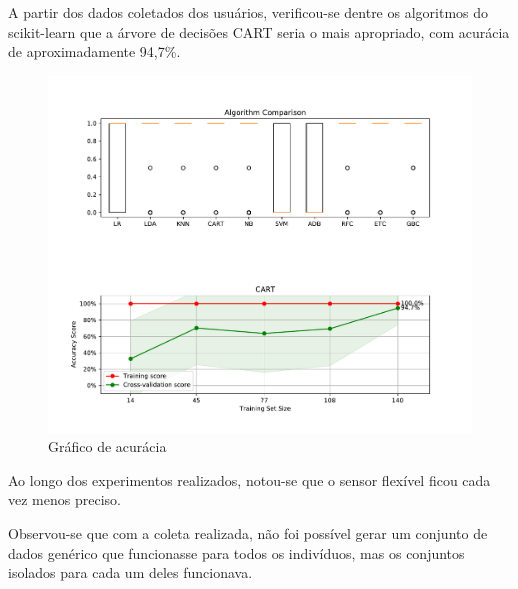 A partir dos dados coletados dos usuários, verificou-se dentre os algoritmos do scikit-learn que a árvore de decisões CART seria o mais apropriado, com acurácia de aproximadamente 94,7\%.
\begin{figure}[ht]
	\caption{\label{fig:result_accuracy_plot}Gráfico de acurácia}
	\begin{center}
	    \includegraphics[width=\textwidth]{resources/result_accuracy_plot}
	\end{center}
\end{figure}

Ao longo dos experimentos realizados, notou-se que o sensor flexível ficou cada vez menos preciso.

Observou-se que com a coleta realizada, não foi possível gerar um conjunto de dados genérico que funcionasse para todos os indivíduos, mas os conjuntos isolados para cada um deles funcionava. 